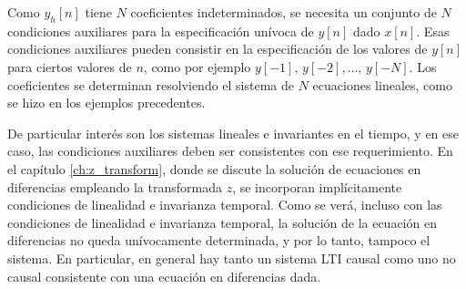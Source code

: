 \documentclass[a4paper]{report}
\begin{document}
Como \(y_h[n]\) tiene \(N\) coeficientes indeterminados, se necesita un conjunto de \(N\) condiciones auxiliares para la especificación unívoca de \(y[n]\) dado \(x[n]\). Esas condiciones auxiliares pueden consistir en la especificación de los valores de \(y[n]\) para ciertos valores de \(n\), como por ejemplo \(y[-1],\,y[-2],\dots,\,y[-N]\). Los coeficientes se determinan resolviendo el sistema de \(N\) ecuaciones lineales, como se hizo en los ejemplos precedentes.
  
De particular interés son los sistemas lineales e invariantes en el tiempo, y en ese caso, las condiciones auxiliares deben ser consistentes con ese requerimiento. En el capítulo \ref{ch:z_transform}, donde se discute la solución de ecuaciones en diferencias empleando la transformada \(z\), se incorporan implícitamente condiciones de linealidad e invarianza temporal. Como se verá, incluso con las condiciones de linealidad e invarianza temporal, la solución de la ecuación en diferencias no queda unívocamente determinada, y por lo tanto, tampoco el sistema. En particular, en general hay tanto un sistema LTI causal como uno no causal consistente con una ecuación en diferencias dada.
\end{document}
